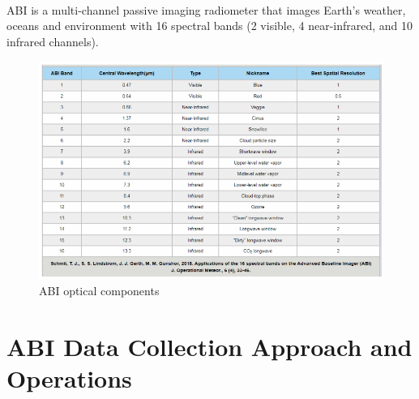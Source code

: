 \paragraph{}
ABI is a multi-channel passive imaging radiometer that images Earth’s weather, oceans and environment with 16 spectral bands (2 visible, 4 near-infrared, and 10 infrared channels).

\begin{figure}[H]
\begin{center}
\includegraphics[scale=0.8]{abi_band_image.png} %
\end{center}
\caption{ABI optical components}
\label{ABI optical components}%
\end{figure}
\section{ABI Data Collection Approach and Operations}

